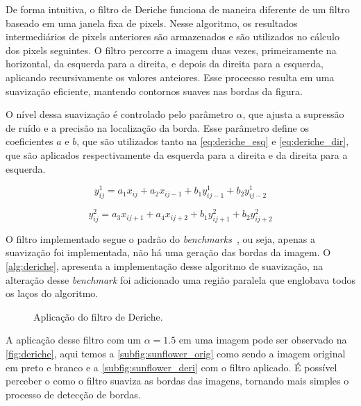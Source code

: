 De forma intuitiva, o filtro de Deriche funciona de maneira diferente de um filtro baseado em uma janela fixa de pixels. Nesse algoritmo, os resultados intermediários de pixels anteriores são armazenados e são utilizados no cálculo dos pixels seguintes. O filtro percorre a imagem duas vezes, primeiramente na horizontal, da esquerda para a direita, e depois da direita para a esquerda, aplicando recursivamente os valores anteiores. Esse procecsso resulta em uma suavização eficiente, mantendo contornos suaves nas bordas da figura.

O nível dessa suavização é controlado pelo parâmetro $\alpha$, que ajusta a supressão de ruído e a precisão na localização da borda. Esse parâmetro define os coeficientes $a$ e $b$, que são utilizados tanto na \autoref{eq:deriche_esq} e \autoref{eq:deriche_dir}, que são aplicados respectivamente da esquerda para a direita e da direita para a esquerda.

\begin{equation}
	\label{eq:deriche_esq}
	y^1_{ij} = a_1x_{ij} + a_2x_{ij - 1} + b_1y^1_{ij - 1} + b_2y^1_{ij - 2}
\end{equation}

\begin{equation}
	\label{eq:deriche_dir}
	y^2_{ij} = a_3x_{ij + 1} + a_4x_{ij + 2} + b_1y^2_{ij + 1} + b_2y^2_{ij + 2}
\end{equation}

O filtro implementado segue o padrão do \textit{benchmarks}~\cite{polybench}, ou seja, apenas a suavização foi implementada, não há uma geração das bordas da imagem. O \autoref{alg:deriche}, apresenta a implementação desse algoritmo de suavização, na alteração desse \textit{benchmark} foi adicionado uma região paralela que englobava todos os laços do algoritmo.

\begin{figure}[htbp]
	\caption{Aplicação do filtro de Deriche.}
	\centering
	\hfill
	\fonte{}
	\label{fig:deriche}
\end{figure}

A aplicação desse filtro com um $\alpha = 1.5$ em uma imagem pode ser observado na \autoref{fig:deriche}, aqui temos a \autoref{subfig:sunflower_orig} como sendo a imagem original em preto e branco e a \autoref{subfig:sunflower_deri} com o filtro aplicado. É possível perceber o como o filtro suaviza as bordas das imagens, tornando mais simples o processo de detecção de bordas.


